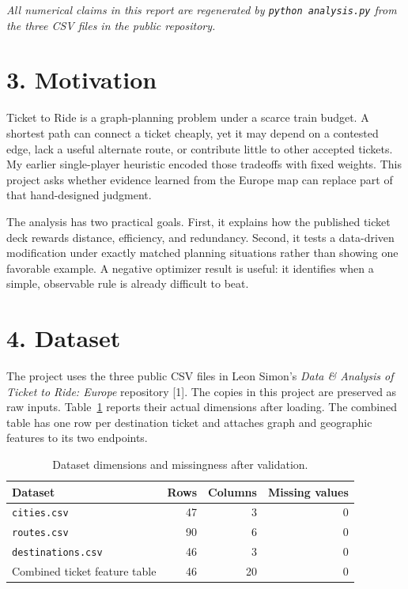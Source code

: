 \documentclass[11pt]{article}
\newcommand{\code}[1]{\texttt{#1}}
\begin{document}
\vfill
\textit{All numerical claims in this report are regenerated by
\code{python analysis.py} from the three CSV files in the public repository.}

\newpage
\section*{3. Motivation}

Ticket to Ride is a graph-planning problem under a scarce train budget. A
shortest path can connect a ticket cheaply, yet it may depend on a contested
edge, lack a useful alternate route, or contribute little to other accepted
tickets. My earlier single-player heuristic encoded those tradeoffs with
fixed weights. This project asks whether evidence learned from the Europe map
can replace part of that hand-designed judgment.

The analysis has two practical goals. First, it explains how the published
ticket deck rewards distance, efficiency, and redundancy. Second, it tests a
data-driven modification under exactly matched planning situations rather
than showing one favorable example. A negative optimizer result is useful:
it identifies when a simple, observable rule is already difficult to beat.

\section*{4. Dataset}

The project uses the three public CSV files in Leon Simon's \textit{Data \&
Analysis of Ticket to Ride: Europe} repository [1]. The copies in this
project are preserved as raw inputs. Table~\ref{tab:data} reports their actual
dimensions after loading. The combined table has one row per destination
ticket and attaches graph and geographic features to its two endpoints.

\begin{table}[h]
\centering
\caption{Dataset dimensions and missingness after validation.}
\label{tab:data}
\begin{tabular}{lrrr}
\toprule
Dataset & Rows & Columns & Missing values \\
\midrule
\code{cities.csv} & 47 & 3 & 0 \\
\code{routes.csv} & 90 & 6 & 0 \\
\code{destinations.csv} & 46 & 3 & 0 \\
Combined ticket feature table & 46 & 20 & 0 \\
\bottomrule
\end{tabular}
\end{table}
\end{document}
